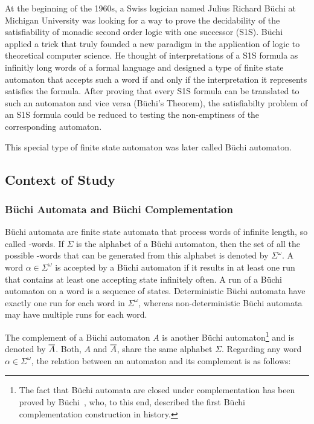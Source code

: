 At the beginning of the 1960s, a Swiss logician named Julius Richard Büchi at Michigan University was looking for a way to prove the decidability of the satisfiability of monadic second order logic with one successor (S1S). Büchi applied a trick that truly founded a new paradigm in the application of logic to theoretical computer science. He thought of interpretations of a S1S formula as infinitly long words of a formal language and designed a type of finite state automaton that accepts such a word if and only if the interpretation it represents satisfies the formula. After proving that every S1S formula can be translated to such an automaton and vice versa (Büchi's Theorem), the satisfiabilty problem of an S1S formula could be reduced to testing the non-emptiness of the corresponding automaton.

This special type of finite state automaton was later called Büchi automaton.

\subsection{Context of Study}


\subsubsection{Büchi Automata and Büchi Complementation}

Büchi automata are finite state automata that process words of infinite length, so called \om-words. If $\Sigma$ is the alphabet of a Büchi automaton, then the set of all the possible \om-words that can be generated from this alphabet is denoted by $\Sigma^\omega$. A word $\alpha \in \Sigma^\omega$ is accepted by a Büchi automaton if it results in at least one run that contains at least one accepting state infinitely often. A run of a Büchi automaton on a word is a sequence of states. Deterministic Büchi automata have exactly one run for each word in $\Sigma^\omega$, whereas non-deterministic Büchi automata may have multiple runs for each word.

The complement of a Büchi automaton $A$ is another Büchi automaton\footnote{The fact that Büchi automata are closed under complementation has been proved by Büchi~\cite{buchi1960decision}, who, to this end, described the first Büchi complementation construction in history.} and is denoted by $\cl1{A}$. Both, $A$ and $\cl1{A}$, share the same alphabet $\Sigma$. Regarding any word $\alpha \in \Sigma^\omega$, the relation between an automaton and its complement is as follows:

